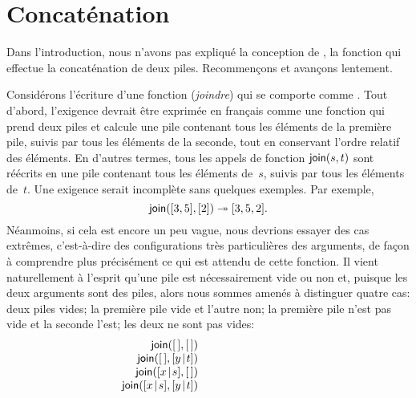\section{Concaténation}

Dans l'introduction, nous n'avons pas expliqué la conception de
, la fonction qui effectue la concaténation de deux
piles. Recommençons et avançons lentement.

Considérons l'écriture d'une fonction  (\emph{joindre})
qui se comporte comme . Tout d'abord, l'exigence devrait
être exprimée en français comme une fonction qui prend deux piles et
calcule une pile contenant tous les éléments de la première pile,
suivis par tous les éléments de la seconde, tout en conservant l'ordre
relatif des éléments. En d'autres termes, tous les appels de fonction
\(\textsf{join}(s,t)\) sont réécrits en une pile contenant tous les
éléments de~\(s\), suivis par tous les éléments de~\(t\). Une exigence
serait incomplète sans quelques exemples. Par exemple,
\begin{equation*}
\textsf{join}([3,5],[2]) \twoheadrightarrow [3,5,2].
\end{equation*}
Néanmoins, si cela est encore un peu vague, nous devrions essayer des
cas extrêmes, c'est-à-dire des configurations très particulières des
arguments, de façon à comprendre plus précisément ce qui est attendu
de cette fonction. Il vient naturellement à l'esprit qu'une pile est
nécessairement vide ou non et, puisque les deux arguments sont des
piles, alors nous sommes amenés à distinguer quatre cas: deux piles
vides; la première pile vide et l'autre non; la première pile n'est
pas vide et la seconde l'est; les deux ne sont pas vides:
\begin{equation*}
\begin{array}{r@{\;}l@{\;}l}
\fun{join}(\el,\el) & \phantom{\rightarrow} & \phantom{\el;}\\
\fun{join}(\el,\cons{y}{t}) & \phantom{\rightarrow} & \phantom{\cons{y}{t};}\\
\fun{join}(\cons{x}{s},\el) & \phantom{\rightarrow} & \phantom{\cons{x}{s};}\\
\fun{join}(\cons{x}{s},\cons{y}{t}) & \phantom{\rightarrow} &
  \phantom{\cons{x}{\fun{join}(s,\cons{y}{t})}.}
\end{array}
\end{equation*}
